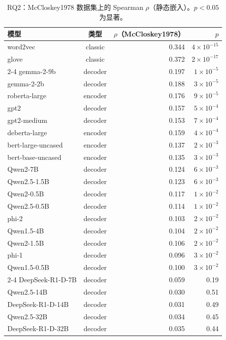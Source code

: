 \documentclass[11pt,a4paper]{article}
\begin{document}
\begin{table}[H]\centering\small
\begin{tabular}{lcrr}
\toprule
\textbf{模型} & \textbf{类型} & \textbf{$\rho$（McCloskey1978）} & \textbf{$p$}\\
\midrule
word2vec & classic & 0.344 & $4\times10^{-15}$\\
glove & classic & 0.372 & $2\times10^{-17}$\\
\cmidrule{2-4}
gemma-2-9b & decoder & 0.197 & $1\times10^{-5}$\\
gemma-2-2b & decoder & 0.188 & $3\times10^{-5}$\\
roberta-large & encoder & 0.176 & $9\times10^{-5}$\\
gpt2 & decoder & 0.157 & $5\times10^{-4}$\\
gpt2-medium & decoder & 0.153 & $7\times10^{-4}$\\
deberta-large & encoder & 0.159 & $4\times10^{-4}$\\
bert-large-uncased & encoder & 0.137 & $2\times10^{-3}$\\
bert-base-uncased & encoder & 0.135 & $3\times10^{-3}$\\
Qwen2-7B & decoder & 0.124 & $6\times10^{-3}$\\
Qwen2.5-1.5B & decoder & 0.123 & $6\times10^{-3}$\\
Qwen2-0.5B & decoder & 0.117 & $1\times10^{-2}$\\
Qwen2.5-0.5B & decoder & 0.114 & $1\times10^{-2}$\\
phi-2 & decoder & 0.103 & $2\times10^{-2}$\\
Qwen1.5-4B & decoder & 0.104 & $2\times10^{-2}$\\
Qwen2-1.5B & decoder & 0.106 & $2\times10^{-2}$\\
phi-1 & decoder & 0.096 & $3\times10^{-2}$\\
Qwen1.5-0.5B & decoder & 0.100 & $3\times10^{-2}$\\
\cmidrule{2-4}
DeepSeek-R1-D-7B & decoder & 0.059 & 0.19\\
Qwen2.5-14B & decoder & 0.030 & 0.51\\
DeepSeek-R1-D-14B & decoder & 0.031 & 0.49\\
Qwen2.5-32B & decoder & 0.034 & 0.45\\
DeepSeek-R1-D-32B & decoder & 0.035 & 0.44\\
\bottomrule
\end{tabular}
\caption{RQ2：McCloskey1978 数据集上的 Spearman $\rho$（静态嵌入）。$p<0.05$ 为显著。}
\label{tab:rq2}
\end{table}
\end{document}
